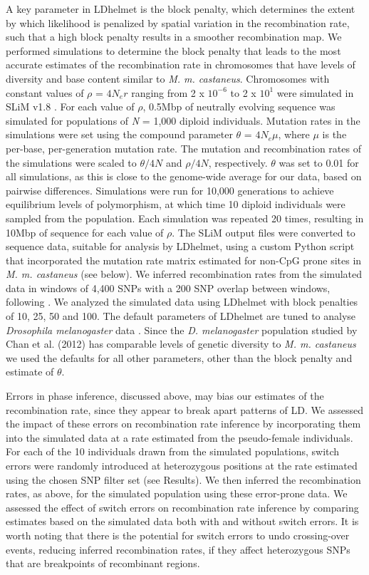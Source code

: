         	A key parameter in LDhelmet is the block penalty, which determines the extent by which likelihood is penalized by spatial variation in the recombination rate, such that a high block penalty results in a smoother recombination map. We performed simulations to determine the block penalty that leads to the most accurate estimates of the recombination rate in chromosomes that have levels of diversity and base content similar to \emph{M. m. castaneus}. Chromosomes with constant values of $\rho$ = $4N_{e}r$ ranging from 2 x $10^{-6}$ to 2 x $10^1$ were simulated in SLiM v1.8 \citep{RN148}. For each value of $\rho$, 0.5Mbp of neutrally evolving sequence was simulated for populations of \emph{N} = 1,000 diploid individuals. Mutation rates in the simulations were set using the compound parameter $\theta$ = $4N_{e}\mu$, where $\mu$ is the per-base, per-generation mutation rate. The mutation and recombination rates of the simulations were scaled to $\theta/4N$ and $\rho/4N$, respectively. $\theta$ was set to 0.01 for all simulations, as this is close to the genome-wide average for our data, based on pairwise differences. Simulations were run for 10,000 generations to achieve equilibrium levels of polymorphism, at which time 10 diploid individuals were sampled from the population. Each simulation was repeated 20 times, resulting in 10Mbp of sequence for each value of $\rho$. The SLiM output files were converted to sequence data, suitable for analysis by LDhelmet, using a custom Python script that incorporated the mutation rate matrix estimated for non-CpG prone sites in \emph{M. m. castaneus} (see below). We inferred recombination rates from the simulated data in windows of 4,400 SNPs with a 200 SNP overlap between windows, following \citep{RN213}. We analyzed the simulated data using LDhelmet with block penalties of 10, 25, 50 and 100. The default parameters of LDhelmet are tuned to analyse \emph{Drosophila melanogaster} data \citep{RN213}. Since the \emph{D. melanogaster} population studied by Chan et al. (2012) has comparable levels of genetic diversity to \emph{M. m. castaneus} we used the defaults for all other parameters, other than the block penalty and estimate of $\theta$.
 
        	Errors in phase inference, discussed above, may bias our estimates of the recombination rate, since they appear to break apart patterns of LD. We assessed the impact of these errors on recombination rate inference by incorporating them into the simulated data at a rate estimated from the pseudo-female individuals. For each of the 10 individuals drawn from the simulated populations, switch errors were randomly introduced at heterozygous positions at the rate estimated using the chosen SNP filter set (see Results). We then inferred the recombination rates, as above, for the simulated population using these error-prone data. We assessed the effect of switch errors on recombination rate inference by comparing estimates based on the simulated data both with and without switch errors. It is worth noting that there is the potential for switch errors to undo crossing-over events, reducing inferred recombination rates, if they affect heterozygous SNPs that are breakpoints of recombinant regions. 

